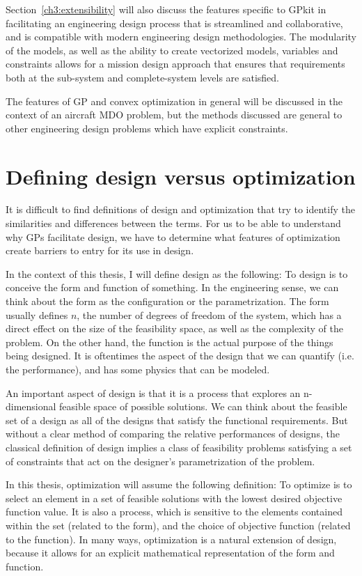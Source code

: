 Section~\ref{ch3:extensibility} will also discuss the features specific to
GPkit in facilitating
an engineering design process that is streamlined and collaborative, and is
compatible with modern engineering design methodologies. The modularity of the
models, as well as the ability to create vectorized models, variables and constraints
allows for a mission design approach that ensures that
requirements both at the sub-system and complete-system levels are satisfied.

The features of \gls{GP} and convex optimization in general will be discussed in
the context of an aircraft \gls{MDO} problem, but the methods discussed
are general to other engineering design problems which have explicit constraints.

\section{Defining design versus optimization} \label{s:DesVsOpt}

It is difficult to find definitions of design and optimization that
try to identify the similarities and differences between the terms. For us to be
able to understand why \gls{GP}s facilitate design, we have to determine what
features of optimization create barriers to entry for its use in design.

In the context of this thesis, I will define design as the following:
To design is to conceive the form and function of something.
In the engineering sense, we can think about the form as the configuration or
the parametrization. The form usually defines $n$, the number of degrees of freedom
of the system, which has a direct effect on the size of the feasibility
space, as well as the complexity of the problem.
On the other hand, the function is the actual purpose of the things
being designed. It is oftentimes the aspect of the design that we can
quantify (i.e. the performance), and has some physics that can be modeled.

An important aspect of design is that it is a process that explores an
n-dimensional feasible space of possible solutions.
We can think about the feasible set of a design as all of the designs
that satisfy the functional requirements. But without a clear method of comparing
the relative performances of designs, the classical
definition of design implies a class of feasibility problems satisfying a set of
constraints that act on the designer's parametrization of the problem.

In this thesis, optimization will assume the following definition: To optimize is to select an
element in a set of feasible solutions with the lowest desired objective
function value. It is also a process, which is sensitive to the elements contained within the set
(related to the form), and the choice of objective function (related to the
function).
In many ways, optimization is a natural extension of design, because it allows
for an explicit mathematical representation of the form and function.

